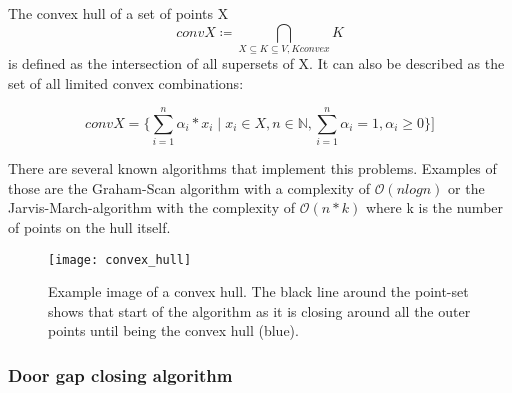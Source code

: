 The convex hull of a set of points X \begin{equation}conv X \coloneqq \underset{X \subseteq K \subseteq V, K convex}{\bigcap} K  \end{equation} is defined as the intersection of all supersets of X. It can also be described as the set of all limited convex combinations:

\begin{equation}conv X = \{ \sum_{i=1}^{n}\alpha_{i} * x_{i} \mid x_{i} \in X, n \in \mathbb{N}, \sum_{i=1}^{n} \alpha_i = 1, \alpha_i \geq 0  \}]\end{equation}

There are several known algorithms that implement this problems. Examples of those are the Graham-Scan algorithm with a complexity of  $\mathcal{O}(n log n)$ or the Jarvis-March-algorithm with the complexity of $\mathcal{O}(n*k)$ where k is the number of points on the hull itself.

\begin{figure}[H]
	\centering
	\texttt{[image: convex\_hull]}
	\caption{Example image of a convex hull. The black line around the point-set shows that start of the algorithm as it is closing around all the outer points until  being the convex hull (blue).}
	\label{fig:convex_hull}
\end{figure}


\pagebreak

\subsubsection{Door gap closing algorithm}
\label{sec:DoorGapAlgorithm}

